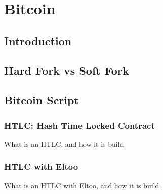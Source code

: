 \chapter{Bitcoin}

\section{Introduction}

\section{Hard Fork vs Soft Fork}
\label{sec:hard_vs_soft}

\section{Bitcoin Script}

\subsection{HTLC: Hash Time Locked Contract}
\label{sec:htlc_intro}
What is an HTLC, and how it is build

\subsection{HTLC with Eltoo}
\label{sec:eltoo_htlc}
What is an HTLC with Eltoo, and how it is build
